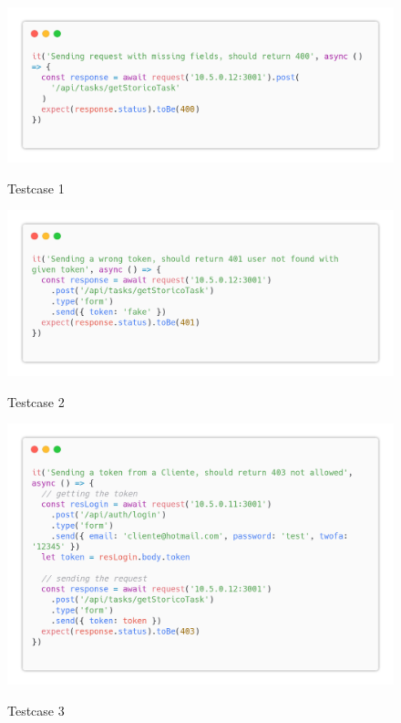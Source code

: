 \documentclass{report}
\begin{document}
\begin{figure}[H]
	\centering\includegraphics[width=1\textwidth]{images/code_storico_test1.png}

	Testcase 1
\end{figure}
\begin{figure}[H]
	\centering\includegraphics[width=1\textwidth]{images/code_storico_test2.png}

	Testcase 2
\end{figure}
\begin{figure}[H]
	\centering\includegraphics[width=1\textwidth]{images/code_storico_test3.png}

	Testcase 3
\end{figure}
\end{document}
